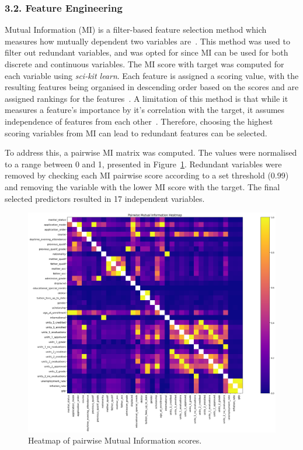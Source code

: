\documentclass[12pt]{article}
\begin{document}
\subsubsection*{3.2. Feature Engineering}

Mutual Information (MI) is a filter-based feature selection method which measures how mutually dependent two variables are~\cite{VenkateshAnuradha2019}. This method was used to filter out redundant variables, and was opted for since MI can be used for both discrete and continuous variables. The MI score with target was computed for each variable using \textit{sci-kit learn}. Each feature is assigned a scoring value, with the resulting features being organised in descending order based on the scores and are assigned rankings for the features~\cite{VenkateshAnuradha2019}. A limitation of this method is that while it measures a feature's importance by it's correlation with the target, it assumes independence of features from each other~\cite{Li2017}. Therefore, choosing the highest scoring variables from MI can lead to redundant features can be selected.

To address this, a pairwise MI matrix was computed. The values were normalised to a range between 0 and 1, presented in Figure~\ref{fig:pairwise_mi}. Redundant variables were removed by checking each MI pairwise score according to a set threshold (0.99) and removing the variable with the lower MI score with the target. The final selected predictors resulted in 17 independent variables.

\begin{figure} [H]
    \centering
    \includegraphics[width=0.8\linewidth]{pairwise_mi}
    \caption{Heatmap of pairwise Mutual Information scores.}\label{fig:pairwise_mi}
  \end{figure}  
\end{document}
